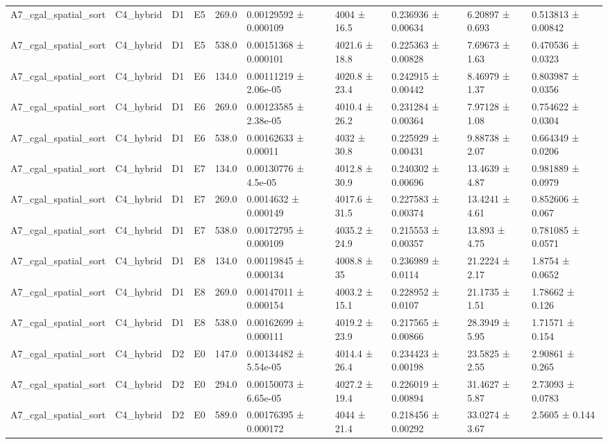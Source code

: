 \begin{table}
\begin{tabular}{llllllllll}
A7\_cgal\_spatial\_sort & C4\_hybrid & D1 & E5 & 269.0 & 0.00129592 ± 0.000109 & 4004 ± 16.5 & 0.236936 ± 0.00634 & 6.20897 ± 0.693 & 0.513813 ± 0.00842 \\
A7\_cgal\_spatial\_sort & C4\_hybrid & D1 & E5 & 538.0 & 0.00151368 ± 0.000101 & 4021.6 ± 18.8 & 0.225363 ± 0.00828 & 7.69673 ± 1.63 & 0.470536 ± 0.0323 \\
A7\_cgal\_spatial\_sort & C4\_hybrid & D1 & E6 & 134.0 & 0.00111219 ± 2.06e-05 & 4020.8 ± 23.4 & 0.242915 ± 0.00442 & 8.46979 ± 1.37 & 0.803987 ± 0.0356 \\
A7\_cgal\_spatial\_sort & C4\_hybrid & D1 & E6 & 269.0 & 0.00123585 ± 2.38e-05 & 4010.4 ± 26.2 & 0.231284 ± 0.00364 & 7.97128 ± 1.08 & 0.754622 ± 0.0304 \\
A7\_cgal\_spatial\_sort & C4\_hybrid & D1 & E6 & 538.0 & 0.00162633 ± 0.00011 & 4032 ± 30.8 & 0.225929 ± 0.00431 & 9.88738 ± 2.07 & 0.664349 ± 0.0206 \\
A7\_cgal\_spatial\_sort & C4\_hybrid & D1 & E7 & 134.0 & 0.00130776 ± 4.5e-05 & 4012.8 ± 30.9 & 0.240302 ± 0.00696 & 13.4639 ± 4.87 & 0.981889 ± 0.0979 \\
A7\_cgal\_spatial\_sort & C4\_hybrid & D1 & E7 & 269.0 & 0.0014632 ± 0.000149 & 4017.6 ± 31.5 & 0.227583 ± 0.00374 & 13.4241 ± 4.61 & 0.852606 ± 0.067 \\
A7\_cgal\_spatial\_sort & C4\_hybrid & D1 & E7 & 538.0 & 0.00172795 ± 0.000109 & 4035.2 ± 24.9 & 0.215553 ± 0.00357 & 13.893 ± 4.75 & 0.781085 ± 0.0571 \\
A7\_cgal\_spatial\_sort & C4\_hybrid & D1 & E8 & 134.0 & 0.00119845 ± 0.000134 & 4008.8 ± 35 & 0.236989 ± 0.0114 & 21.2224 ± 2.17 & 1.8754 ± 0.0652 \\
A7\_cgal\_spatial\_sort & C4\_hybrid & D1 & E8 & 269.0 & 0.00147011 ± 0.000154 & 4003.2 ± 15.1 & 0.228952 ± 0.0107 & 21.1735 ± 1.51 & 1.78662 ± 0.126 \\
A7\_cgal\_spatial\_sort & C4\_hybrid & D1 & E8 & 538.0 & 0.00162699 ± 0.000111 & 4019.2 ± 23.9 & 0.217565 ± 0.00866 & 28.3949 ± 5.95 & 1.71571 ± 0.154 \\
A7\_cgal\_spatial\_sort & C4\_hybrid & D2 & E0 & 147.0 & 0.00134482 ± 5.54e-05 & 4014.4 ± 26.4 & 0.234423 ± 0.00198 & 23.5825 ± 2.55 & 2.90861 ± 0.265 \\
A7\_cgal\_spatial\_sort & C4\_hybrid & D2 & E0 & 294.0 & 0.00150073 ± 6.65e-05 & 4027.2 ± 19.4 & 0.226019 ± 0.00894 & 31.4627 ± 5.87 & 2.73093 ± 0.0783 \\
A7\_cgal\_spatial\_sort & C4\_hybrid & D2 & E0 & 589.0 & 0.00176395 ± 0.000172 & 4044 ± 21.4 & 0.218456 ± 0.00292 & 33.0274 ± 3.67 & 2.5605 ± 0.144 \\

\end{tabular}
\end{table}
